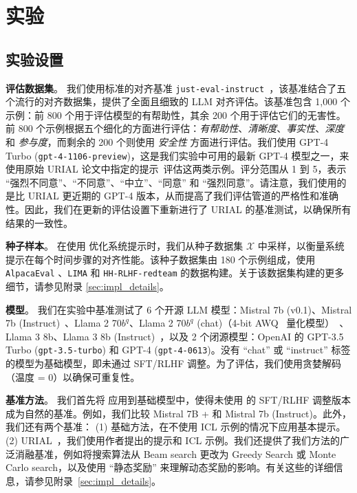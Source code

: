 \section{实验}
\subsection{实验设置}



\noindent \textbf{评估数据集}。
我们使用标准的对齐基准 \texttt{just-eval-instruct}~\cite{Lin2024ReAlign}，该基准结合了五个流行的对齐数据集，提供了全面且细致的 LLM 对齐评估。该基准包含 1,000 个示例：前 800 个用于评估模型的有帮助性，其余 200 个用于评估它们的无害性。前 800 个示例根据五个细化的方面进行评估：\textit{有帮助性}、\textit{清晰度}、\textit{事实性}、\textit{深度} 和 \textit{参与度}，而剩余的 200 个则使用 \textit{安全性} 方面进行评估。我们使用 GPT-4 Turbo (\texttt{gpt-4-1106-preview})，这是我们实验中可用的最新 GPT-4 模型之一，来使用原始 URIAL 论文中指定的提示~\cite{Lin2024ReAlign}评估这两类示例。评分范围从 1 到 5，表示 ``强烈不同意''、``不同意''、``中立''、``同意'' 和 ``强烈同意''。请注意，我们使用的是比 URIAL 更近期的 GPT-4 版本，从而提高了我们评估管道的严格性和准确性。因此，我们在更新的评估设置下重新进行了 URIAL 的基准测试，以确保所有结果的一致性。

\noindent \textbf{种子样本}。
在使用 \ours 优化系统提示时，我们从种子数据集 $\mathcal{X}$ 中采样，以衡量系统提示在每个时间步骤的对齐性能。该种子数据集由 180 个示例组成，使用 \texttt{AlpacaEval} \cite{alpaca_eval}、\texttt{LIMA} \cite{zhou2024lima} 和 \texttt{HH-RLHF-redteam} \cite{Ganguli2022RedTL} 的数据构建。关于该数据集构建的更多细节，请参见附录 \ref{sec:impl_details}。

\noindent \textbf{模型}。
我们在实验中基准测试了 6 个开源 LLM 模型：Mistral 7b (v0.1)、Mistral 7b (Instruct)~\cite{Jiang2023Mistral7}、Llama 2 70$b^q$、Llama 2 70$b^q$ (chat)（4-bit AWQ~\cite{lin2023awq} 量化模型）~\cite{Touvron2023Llama2O}、Llama 3 8b、Llama 3 8b (Instruct)~\cite{llama3modelcard}，以及 2 个闭源模型：OpenAI 的 GPT-3.5 Turbo (\texttt{gpt-3.5-turbo}) 和 GPT-4 (\texttt{gpt-4-0613})。没有 ``chat'' 或 ``instruct'' 标签的模型为基础模型，即未通过 SFT/RLHF 调整。为了评估，我们使用贪婪解码（温度 = 0）以确保可重复性。

\noindent \textbf{基准方法}。
我们首先将 \ours 应用到基础模型中，使得未使用 \ours 的 SFT/RLHF 调整版本成为自然的基准。例如，我们比较 Mistral 7B + \ours 和 Mistral 7b (Instruct)。此外，我们还有两个基准： (1) 基础方法，在不使用 ICL 示例的情况下应用基本提示。 (2) URIAL~\cite{Lin2024ReAlign}，我们使用作者提出的提示和 ICL 示例。我们还提供了我们方法的广泛消融基准，例如将搜索算法从 Beam search 更改为 Greedy Search 或 Monte Carlo search，以及使用 ``静态奖励'' 来理解动态奖励的影响。有关这些的详细信息，请参见附录~\ref{sec:impl_details}。

